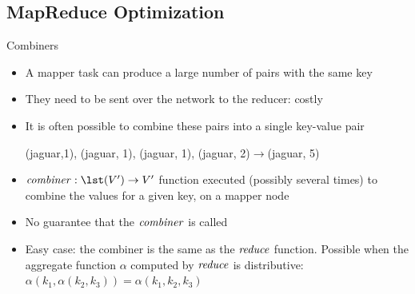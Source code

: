 \subsection{MapReduce Optimization}

\begin{frame}{Combiners}

\begin{itemize}
\item A mapper task can produce a large number of pairs with the same key

\item They need to be sent over the network to the reducer: \alert{costly}

\item It is often possible to \alert{combine} these pairs into a single
key-value pair
\begin{example}
(jaguar,1), (jaguar, 1), (jaguar, 1), (jaguar, 2)$\rightarrow$(jaguar, 5)
\end{example}

\item $\combiner:\lst(V')\rightarrow V'$ function executed (possibly
several times) to \alert{combine the values for a given key}, on a mapper node

\item No guarantee that the $\mathop{\mathit{combiner}}$ is called

\item Easy case: the combiner is the same as the $\mathop{\mathit{reduce}}$ function.
Possible when the aggregate function $\alpha$ computed by $\mathop{\mathit{reduce}}$ is
\alert{distributive}: $\alpha(k_1,\alpha(k_2,k_3))=\alpha(k_1,k_2,k_3)$
\end{itemize}

\end{frame}


